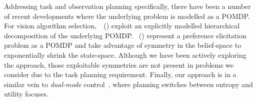





Addressing task and observation planning specifically, there have been
a number of recent developments where the underlying problem is
modelled as a POMDP.
For vision algorithm
selection,~\citeauthor{hippo-jnl}~(\citeyear{hippo-jnl}) exploit an
explicitly modelled hierarchical decomposition of the underlying
POMDP. \citeauthor{doshi08:pref_elic}~(\citeyear{doshi08:pref_elic})
represent a preference elicitation problem as a POMDP and take
advantage of symmetry in the belief-space to exponentially shrink the
state-space. Although we have been actively exploring
the \citeauthor{doshi08:pref_elic} approach, those exploitable
symmetries are not present in problems we consider due to the task
planning requirement.
Finally, our approach is in a similar vein to {\em dual-mode}
control~\cite{cassandra96actingunder}, where planning switches between
entropy and utility focuses.






